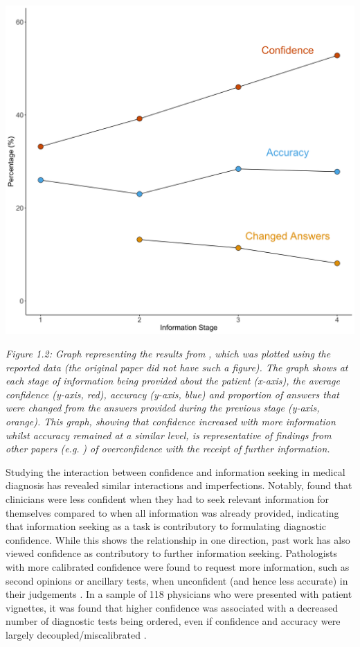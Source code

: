 \documentclass[a4paper, nobind]{templates/ociamthesis}
\begin{document}
\newpage

\begin{center}\includegraphics[width=1\linewidth]{./assets/OskampGraph} \end{center}

\emph{Figure 1.2: Graph representing the results from} \textcite{oskamp_overconfidence_1965}\emph{, which was plotted using the reported data (the original paper did not have such a figure). The graph shows at each stage of information being provided about the patient (x-axis), the average confidence (y-axis, red), accuracy (y-axis, blue) and proportion of answers that were changed from the answers provided during the previous stage (y-axis, orange). This graph, showing that confidence increased with more information whilst accuracy remained at a similar level, is representative of findings from other papers (e.g.} \textcite{meyer_physicians_2013}\emph{) of overconfidence with the receipt of further information.}

\hfill\break
Studying the interaction between confidence and information seeking in medical diagnosis has revealed similar interactions and imperfections. Notably, \textcite{gruppen_information_1991} found that clinicians were less confident when they had to seek relevant information for themselves compared to when all information was already provided, indicating that information seeking as a task is contributory to formulating diagnostic confidence. While this shows the relationship in one direction, past work has also viewed confidence as contributory to further information seeking. Pathologists with more calibrated confidence were found to request more information, such as second opinions or ancillary tests, when unconfident (and hence less accurate) in their judgements \autocite{clayton_are_2023}. In a sample of 118 physicians who were presented with patient vignettes, it was found that higher confidence was associated with a decreased number of diagnostic tests being ordered, even if confidence and accuracy were largely decoupled/miscalibrated \autocite{meyer_physicians_2013}.
\end{document}
